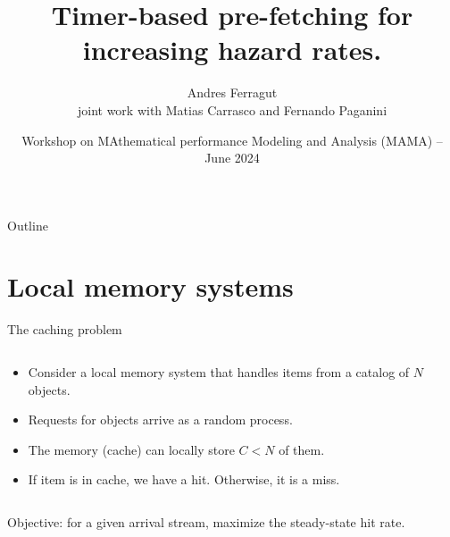 \documentclass[aspectratio=169]{beamer}
\title{Timer-based pre-fetching for increasing hazard rates.}
\author[Andres Ferragut, Universidad ORT Uruguay]{Andres Ferragut\\[.6em] \normalsize joint work with Matias Carrasco and Fernando Paganini}
\institute{Universidad ORT Uruguay}
\date[MAMA Workshop -- June 2024]{Workshop on MAthematical performance Modeling and Analysis (MAMA) -- June 2024}
\newenvironment*{myitem}[1][1.5em]{\begin{itemize}\setlength{\itemsep}{#1}}{\end{itemize}}
\begin{document}
\frame[plain]{\titlepage}

\begin{frame}{Outline}
\tableofcontents
\end{frame}

\section{Local memory systems}

\begin{frame}{The caching problem}
	
	\begin{columns}
		\begin{column}{0.61\textwidth}
			\begin{myitem}[2em]
				\item Consider a \alert{local memory system} that handles items from a catalog of $N$ objects.
				\item Requests for objects arrive as a random process.
				\item The memory (cache) can locally store $C<N$ of them.
				\item If item is in cache, we have a \alert{hit}. Otherwise, it is a \alert{miss}.
			\end{myitem}
		\end{column}
		\begin{column}{0.39\textwidth}
			\centering
			
		\end{column}
	\end{columns}

	\vfill

	\centering
	\alert{Objective:} for a given arrival stream, maximize the steady-state \alert{hit rate}.
\end{frame}
\end{document}
